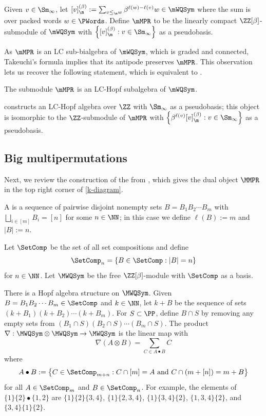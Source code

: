 \begin{definition}
Given  $v \in \Sm_\infty$, let 
$ [v]^{(\beta)}_\m := \sum_{ v \leq_\m w} \beta^{\ell(w)-\ell(v)} w \in \mWQSym$
where the sum is over packed words $w \in \PWords$.
Define $\mMPR$ to be the 
linearly compact $\ZZ[\beta]$-submodule of $\mWQSym$ with  $\left\{[v]^{(\beta)}_\m : v \in \Sm_\infty\right\}$ as a pseudobasis.
\end{definition}



As $\mMPR$ is an LC sub-bialgebra of $\mWQSym$,
which is graded and connected, Takeuchi's formula \cite[Prop.~1.4.22]{GrinbergReiner} implies that its antipode preserves $\mMPR$. This observation lets us
recover the following statement, which is equivalent to \cite[Thms.~4.2 and 7.12]{LamPyl}. 

\begin{theorem}
\label{mmpr-thm}
The submodule $\mMPR$ is an LC-Hopf subalgebra of $\mWQSym$.
\end{theorem}



\cite[Thm.~4.2]{LamPyl}
constructs an LC-Hopf algebra over $\ZZ$ with $\Sm_\infty$ as a pseudobasis;
this object is isomorphic to the $\ZZ$-submodule of $\mMPR$ 
with $\left\{\beta^{\ell(v)} [v]^{(\beta)}_\m : v \in \Sm_\infty\right\}$ as a pseudobasis.


 
\subsection{Big multipermutations}

Next, we review the construction of the  
from \cite{LamPyl},
which gives the dual object $\MMPR$ in the top right corner of \eqref{k-diagram}.

A  
is a sequence of pairwise disjoint nonempty sets $B=B_1B_2\cdots B_m$
with $\bigsqcup_{i \in[m]} B_i = [n]$ for some $n \in \NN$;
in this case we define
 $\ell(B) := m$ and 
 $|B| := n$.

\begin{definition}
Let $\SetComp$ be the set of all set compositions
and define \[\SetComp_n = \{ B \in \SetComp : |B| = n\}\] for $n \in \NN$.
Let $\MWQSym$ be the free $\ZZ[\beta]$-module with $\SetComp$ as a basis.
\end{definition}
%
There is a Hopf algebra structure on $\MWQSym$. 
Given $B=B_1B_2\cdots B_m \in \SetComp$ and $k \in \NN$,
let $k + B $ be the sequence of sets $(k+B_1)(k+B_2)\cdots (k+B_m)$.
For $S \subset \PP$,
define $B \cap S$ 
by removing any empty sets from $(B_1\cap S)(B_2\cap S)\cdots (B_m\cap S)$.
The product $\nabla : \MWQSym \otimes \MWQSym \to \MWQSym$
is the linear map with \[\nabla(A\otimes B) = 
\sum
_{C \in A\bullet B} 
C\]
where
\[A\bullet B := \left\{ C \in \SetComp_{m+n} : C \cap [m] = A\text{ and }C \cap (m+[n]) = m + B\right\}\]
for all $A \in \SetComp_m$ and $B \in \SetComp_n$.
For example,
the elements of $ \{1\}\{2\} \bullet \{1,2\}$ are
$\{1\}\{2\}\{3,4\}$,
$\{1\}\{2,3,4\}$,
$\{1\}\{3,4\}\{2\}$,
$\{1,3,4\}\{2\}$,
and
$\{3,4\}\{1\}\{2\}$.


